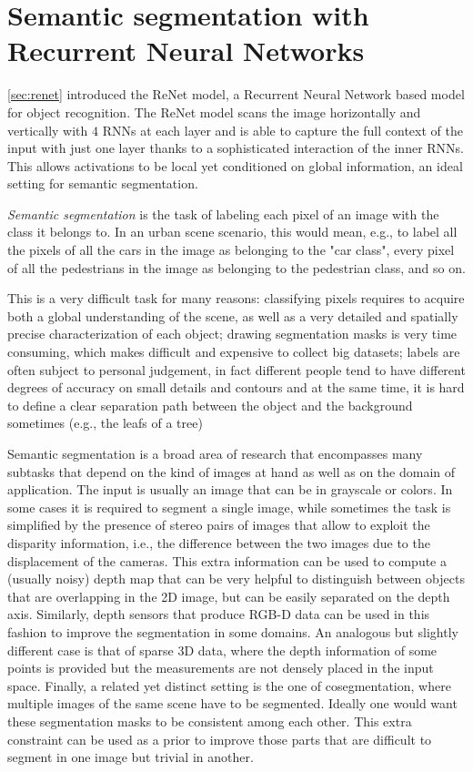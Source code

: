 \chapter{Semantic segmentation with Recurrent Neural Networks}\label{sec:reseg}

\autoref{sec:renet} introduced the ReNet model, a Recurrent Neural Network
based model for object recognition. The ReNet model scans the image
horizontally and vertically with $4$ RNNs at each layer and is able to capture
the full context of the input with just one layer thanks to a sophisticated
interaction of the inner RNNs. This allows activations to be local yet
conditioned on global information, an ideal setting for semantic segmentation.

\emph{Semantic segmentation} is the task of labeling each pixel of an image
with the class it belongs to. In an urban scene scenario, this would mean,
e.g., to label all the pixels of all the cars in the image as belonging to the
"car class", every pixel of all the pedestrians in the image as belonging to
the pedestrian class, and so on.

This is a very difficult task for many reasons: classifying pixels requires to
acquire both a global understanding of the scene, as well as a very detailed
and spatially precise characterization of each object; drawing segmentation
masks is very time consuming, which makes difficult and expensive to collect
big datasets; labels are often subject to personal judgement, in fact different
people tend to have different degrees of accuracy on small details and
contours and at the same time, it is hard to define a clear separation path
between the object and the background sometimes (e.g., the leafs of a tree)

Semantic segmentation is a broad area of research that encompasses many
subtasks that depend on the kind of images at hand as well as on the domain of
application. The input is usually an image that can be in grayscale or colors.
In some cases it is required to segment a single image, while sometimes the
task is simplified by the presence of stereo pairs of images that allow to
exploit the disparity information, i.e., the difference between the two images
due to the displacement of the cameras. This extra information can be used to
compute a (usually noisy) depth map that can be very helpful to distinguish
between objects that are overlapping in the 2D image, but can be easily
separated on the depth axis. Similarly, depth sensors that produce RGB-D data
can be used in this fashion to improve the segmentation in some domains. An
analogous but slightly different case is that of sparse 3D data, where the
depth information of some points is provided but the measurements are not
densely placed in the input space.
Finally, a related yet distinct setting is the one of cosegmentation, where
multiple images of the same scene have to be segmented. Ideally one would want
these segmentation masks to be consistent among each other. This extra
constraint can be used as a prior to improve those parts that are difficult to
segment in one image but trivial in another.

